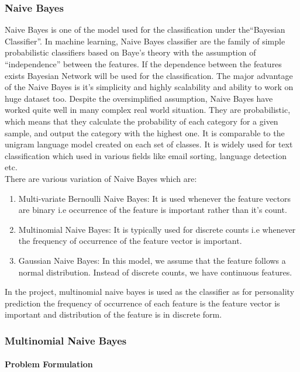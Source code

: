 \subsubsection{ Naive Bayes}
Naive Bayes is one of the model used for the classification under the``Bayesian Classifier''. In machine learning, Naive Bayes classifier are the family of simple probabilistic classifiers based on Baye's theory with the assumption of ``independence'' between the features. If the dependence between the features exists Bayesian Network will be used for the classification. The major advantage of the Naive Bayes is it's simplicity and highly scalability and ability to work on huge dataset too. Despite the oversimplified assumption, Naive Bayes have worked quite well in many complex real world situation.
They are probabilistic, which means that they calculate the probability of each category for a given sample, and output the category with the highest one. It is comparable to the unigram language model created on each set of classes. It is widely used for text classification which used in various fields like email sorting, language detection etc. \\
There are various variation of Naive Bayes which are:
\begin{enumerate}
\item Multi-variate Bernoulli Naive Bayes: It is used whenever the feature vectors are binary i.e occurrence of the feature is important rather than it's count.
\item Multinomial Naive Bayes: It is typically used for discrete counts i.e whenever the frequency of occurrence of the feature vector is important.
\item Gaussian Naive Bayes: In this model, we assume that the feature follows a normal distribution. Instead of discrete counts, we have continuous features.
\end{enumerate}
In the project, multinomial naive bayes is used as the classifier as for personality prediction the frequency of occurrence of each feature is the feature vector is important and distribution of the feature is in discrete form.

\subsubsection{Multinomial Naive Bayes}
\paragraph{Problem Formulation}\hfill

